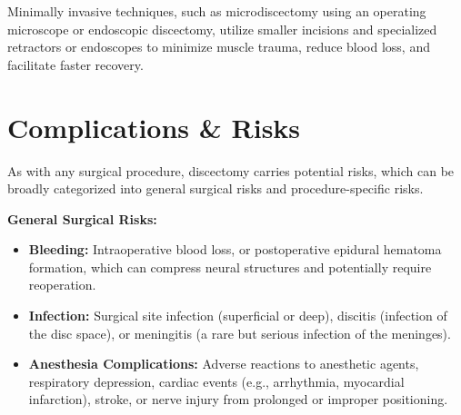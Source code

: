 Minimally invasive techniques, such as microdiscectomy using an operating microscope or endoscopic discectomy, utilize smaller incisions and specialized retractors or endoscopes to minimize muscle trauma, reduce blood loss, and facilitate faster recovery.

\section*{Complications \& Risks}
As with any surgical procedure, discectomy carries potential risks, which can be broadly categorized into general surgical risks and procedure-specific risks.

\textbf{General Surgical Risks:}
\begin{itemize}
  \item \textbf{Bleeding:} Intraoperative blood loss, or postoperative epidural hematoma formation, which can compress neural structures and potentially require reoperation.
  \item \textbf{Infection:} Surgical site infection (superficial or deep), discitis (infection of the disc space), or meningitis (a rare but serious infection of the meninges).
  \item \textbf{Anesthesia Complications:} Adverse reactions to anesthetic agents, respiratory depression, cardiac events (e.g., arrhythmia, myocardial infarction), stroke, or nerve injury from prolonged or improper positioning.
\end{itemize}

